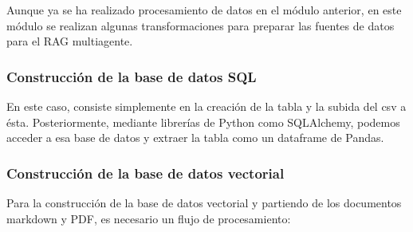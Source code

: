 Aunque ya se ha realizado procesamiento de datos en el módulo anterior, en este módulo se realizan algunas transformaciones para preparar las fuentes de datos para el RAG multiagente.

\subsubsection{Construcción de la base de datos SQL}

En este caso, consiste simplemente en la creación de la tabla y la subida del csv a ésta.
Posteriormente, mediante librerías de Python como SQLAlchemy, podemos acceder a esa base de datos y extraer la tabla como un dataframe de Pandas.

\subsubsection{Construcción de la base de datos vectorial}

Para la construcción de la base de datos vectorial y partiendo de los documentos markdown y PDF, es necesario un flujo de procesamiento:

